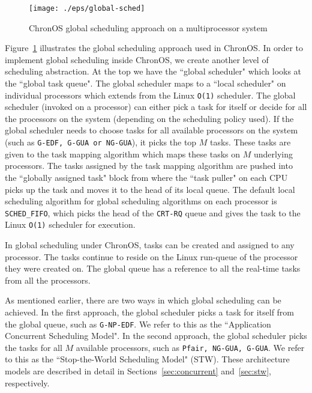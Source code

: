 \documentclass[12pt,dvips]{report}
\begin{document}
\begin{figure} [htbp]
  \centering
  \texttt{[image: ./eps/global-sched]}
  \caption{ChronOS global scheduling approach on a multiprocessor system}
  \label{fig:global-sched}
\end{figure}

Figure~\ref{fig:global-sched} illustrates the global scheduling approach used in ChronOS. In order to implement global scheduling inside ChronOS, we create another level of scheduling abstraction. At the top we have the ``global scheduler" which looks at the ``global task queue". The global scheduler maps to a ``local scheduler" on individual processors which extends from the Linux \texttt{O(1)} scheduler. The global scheduler (invoked on a processor) can either pick a task for itself or decide for all the processors on the system (depending on the scheduling policy used). If the global scheduler needs to choose tasks for all available processors on the system (such as \texttt{G-EDF, G-GUA or NG-GUA}), it picks the top $M$ tasks. These tasks are given to the task mapping algorithm which maps these tasks on $M$ underlying processors. The tasks assigned by the task mapping algorithm are pushed into the ``globally assigned task" block from where the ``task puller" on each CPU picks up the task and moves it to the head of its local queue. The default local scheduling algorithm for global scheduling algorithms on each processor is \texttt{SCHED\_FIFO}, which picks the head of the \texttt{CRT-RQ} queue and gives the task to the Linux \texttt{O(1)} scheduler for execution.

In global scheduling under ChronOS, tasks can be created and assigned to any processor. The tasks continue to reside on the Linux run-queue of the processor they were created on. The global queue has a reference to all the real-time tasks from all the processors.

As mentioned earlier, there are two ways in which global scheduling can be achieved. In the first approach, the global scheduler picks a task for itself from the global queue, such as \texttt{G-NP-EDF}. We refer to this as the ``Application Concurrent Scheduling Model". In the second approach, the global scheduler picks the tasks for all $M$ available processors, such as \texttt{Pfair, NG-GUA, G-GUA}. We refer to this as the ``Stop-the-World Scheduling Model" (STW). These architecture models are described in detail in Sections~\ref{sec:concurrent} and~\ref{sec:stw}, respectively.
\end{document}

